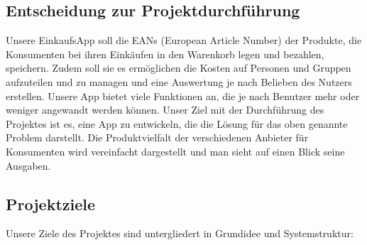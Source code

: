 \documentclass[12pt,a4paper]{article}
\begin{document}
\subsection{Entscheidung zur Projektdurchführung}
Unsere EinkaufsApp soll die EANs (European Article Number) der Produkte, die Konsumenten bei ihren Einkäufen in den Warenkorb legen und bezahlen, speichern.
Zudem soll sie es ermöglichen die Kosten auf Personen und Gruppen aufzuteilen und zu managen und eine Auswertung je nach Belieben des Nutzers erstellen.
Unsere App bietet viele Funktionen an, die je nach Benutzer mehr oder weniger angewandt werden können.
Unser Ziel mit der Durchführung des Projektes ist es, eine App zu entwickeln, die die Lösung für das oben genannte Problem darstellt. 
Die Produktvielfalt der verschiedenen Anbieter für Konsumenten wird vereinfacht dargestellt und man sieht auf einen Blick seine Ausgaben.

\newpage

\subsection{Projektziele}
Unsere Ziele des Projektes sind untergliedert in Grundidee und Systemstruktur:
\end{document}
